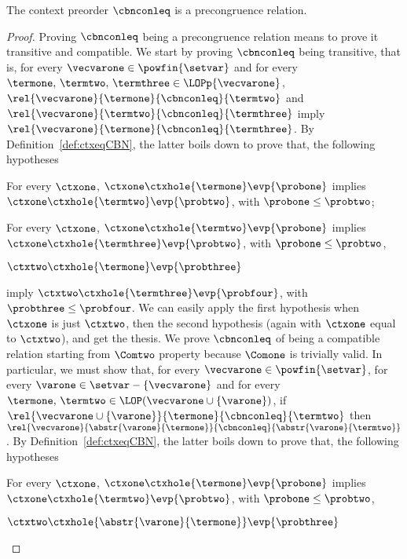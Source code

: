 \begin{lemma}\label{lemma:ctxprecCBN}
  The context preorder $\cbnconleq$ is a precongruence relation.
\end{lemma}
\begin{proof}
  Proving $\cbnconleq$ being a precongruence relation means to prove it
  transitive and compatible.  We start by proving $\cbnconleq$ being
  transitive, that is, for every $\vecvarone\in\powfin{\setvar}$ and for
  every $\termone,\,\termtwo,\,\termthree\in\LOPp{\vecvarone}$,
  $\rel{\vecvarone}{\termone}{\cbnconleq}{\termtwo}$ and
  $\rel{\vecvarone}{\termtwo}{\cbnconleq}{\termthree}$ imply
  $\rel{\vecvarone}{\termone}{\cbnconleq}{\termthree}$. By
  Definition~\ref{def:ctxeqCBN}, the latter boils down to prove that,
  the following hypotheses
  \begin{varitemize}
  \item For every $\ctxone$, $\ctxone\ctxhole{\termone}\evp{\probone}$
    implies $\ctxone\ctxhole{\termtwo}\evp{\probtwo}$, with
    $\probone\leq\probtwo$;
  \item For every $\ctxone$, $\ctxone\ctxhole{\termtwo}\evp{\probone}$
    implies $\ctxone\ctxhole{\termthree}\evp{\probtwo}$, with
    $\probone\leq\probtwo$,
  \item $\ctxtwo\ctxhole{\termone}\evp{\probthree}$
  \end{varitemize}
  imply $\ctxtwo\ctxhole{\termthree}\evp{\probfour}$, with
  $\probthree\leq\probfour$. We can easily apply the first hypothesis when
  $\ctxone$ is just $\ctxtwo$, then the second hypothesis (again with
  $\ctxone$ equal to $\ctxtwo$), and get the thesis.
  We prove $\cbnconleq$ of being a compatible relation starting from
  $\Comtwo$ property because $\Comone$ is trivially valid. In particular,
  we must show that, for every $\vecvarone\in\powfin{\setvar}$, for every
  $\varone\in\setvar-\{\vecvarone\}$ and for every $\termone,\,
  \termtwo\in\LOP(\vecvarone\cup\{\varone\})$, if
  $\rel{\vecvarone\cup\{\varone\}}{\termone}{\cbnconleq}{\termtwo}$ then
  $\rel{\vecvarone}{\abstr{\varone}{\termone}}{\cbnconleq}{\abstr{\varone}{\termtwo}}$.
  By Definition~\ref{def:ctxeqCBN}, the latter boils down to prove that,
  the following hypotheses
  \begin{varitemize}
  \item For every $\ctxone$, $\ctxone\ctxhole{\termone}\evp{\probone}$
    implies $\ctxone\ctxhole{\termtwo}\evp{\probtwo}$, with
    $\probone\leq\probtwo$,
  \item $\ctxtwo\ctxhole{\abstr{\varone}{\termone}}\evp{\probthree}$

\end{varitemize}
\end{proof}
